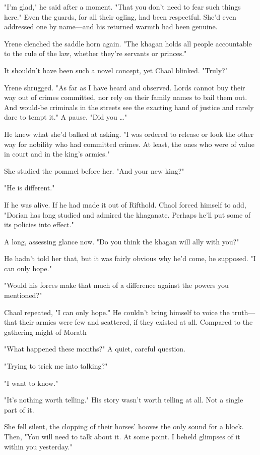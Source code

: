 "I'm glad," he said after a moment. "That you don't need to fear such things here." Even the guards, for all their ogling, had been respectful. She'd even addressed one by name---and his returned warmth had been genuine.

Yrene clenched the saddle horn again. "The khagan holds all people accountable to the rule of the law, whether they're servants or princes."

It shouldn't have been such a novel concept, yet  Chaol blinked. "Truly?"

Yrene shrugged. "As far as I have heard and observed. Lords cannot buy their way out of crimes committed, nor rely on their family names to bail them out. And would-be criminals in the streets see the exacting hand of justice and rarely dare to tempt it." A pause. "Did you
\ldots"

He knew what she'd balked at asking. "I was ordered to release or look the other way for nobility who had committed crimes. At least, the ones who were of value in court and in the king's armies."

She studied the pommel before her. "And your new king?"

"He is different."

If he was alive. If he had made it out of Rifthold. Chaol forced himself to add, "Dorian has long studied and admired the khaganate. Perhaps he'll put some of its policies into effect."

A long, assessing glance now. "Do you think the khagan will ally with you?"

He hadn't told her that, but it was fairly obvious why he'd come, he supposed. "I can only hope."

"Would his forces make that much of a difference against  the powers you mentioned?"

Chaol repeated, "I can only hope." He couldn't bring himself to voice the truth---that their armies were few and scattered, if they existed at all. Compared to the gathering might of Morath 

"What happened these months?" A quiet, careful question.

"Trying to trick me into talking?"

"I want to know."

"It's nothing worth telling." His story wasn't worth telling at all. Not a single part of it.

She fell silent, the clopping of their horses' hooves the only sound for a block. Then, "You will need to talk about it. At some point. I
 beheld glimpses of it within you yesterday."

